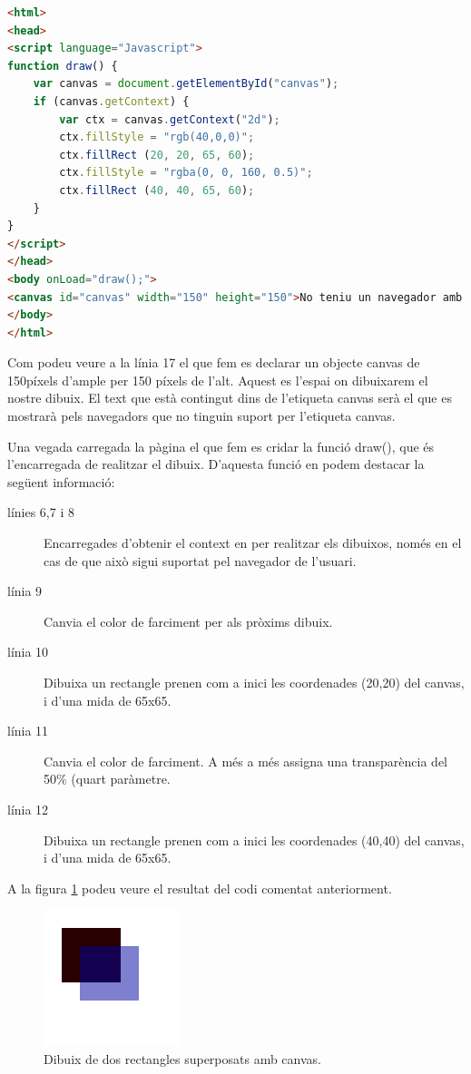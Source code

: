 \begin{lstlisting}[language=html]
<html>
<head>
<script language="Javascript">
function draw() {
    var canvas = document.getElementById("canvas");
    if (canvas.getContext) {
        var ctx = canvas.getContext("2d");
        ctx.fillStyle = "rgb(40,0,0)";
        ctx.fillRect (20, 20, 65, 60);
        ctx.fillStyle = "rgba(0, 0, 160, 0.5)";
        ctx.fillRect (40, 40, 65, 60);
    }
}
</script>
</head>
<body onLoad="draw();">
<canvas id="canvas" width="150" height="150">No teniu un navegador amb suport per visualitzar elements canvias.</canvas>
</body>
</html>
\end{lstlisting}

Com podeu veure a la línia 17 el que fem es declarar un objecte canvas de 150píxels d'ample per 150 píxels de l'alt. Aquest es l'espai on dibuixarem el nostre dibuix. El text que està contingut dins de l'etiqueta canvas serà el que es mostrarà pels navegadors que no tinguin suport per l'etiqueta canvas. 

Una vegada carregada la pàgina el que fem es cridar la funció draw(), que és l'encarregada de realitzar el dibuix. D'aquesta funció en podem destacar la següent informació:

\begin{description}
\item[línies 6,7 i 8]{Encarregades d'obtenir el context en per realitzar els dibuixos, només en el cas de que això sigui suportat pel navegador de l'usuari.}
\item[línia 9]{Canvia el color de farciment per als pròxims dibuix.}
\item[línia 10]{Dibuixa un rectangle prenen com a inici les coordenades (20,20) del canvas, i d'una mida de 65x65.}
\item[línia 11]{Canvia el color de farciment. A més a més assigna una transparència del 50\% (quart paràmetre.}
\item[línia 12]{Dibuixa un rectangle prenen com a inici les coordenades (40,40) del canvas, i d'una mida de 65x65.}
\end{description}

A la figura \ref{fig:canvas-exemple-1} podeu veure el resultat del codi comentat anteriorment. 

\begin{figure}[htbp]
\centering\includegraphics{img/canvas_example1.png}
\caption{Dibuix de dos rectangles superposats amb canvas.}
\label{fig:canvas-exemple-1}
\end{figure} 

